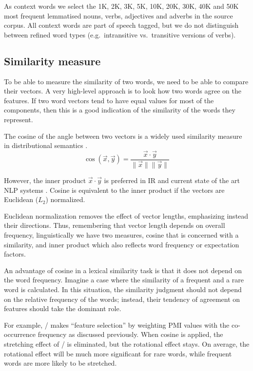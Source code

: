 As context words we select the 1K, 2K, 3K, 5K, 10K, 20K, 30K, 40K and 50K most frequent lemmatised nouns, verbs, adjectives and adverbs in the source corpus. All context words are part of speech tagged, but we do not distinguish between refined word types (e.g.~intransitive vs.~transitive versions of verbs).

\subsection{Similarity measure}
\label{sec:similarity-measure}

To be able to measure the similarity of two words, we need to be able to compare their vectors. A very high-level approach is to look how two words agree on the features. If two word vectors tend to have equal values for most of the components, then this is a good indication of the similarity of the words they represent.

The cosine of the angle between two vectors is a widely used similarity measure in distributional semantics \cite{Turney:2010:FMV:1861751.1861756,lapesa2014large}.
%
\begin{equation*}
  \label{eq:cos}
  \cos(\vec{x}, \vec{y}) = \frac{\vec{x} \cdot \vec{y}}
                                {\|\vec{x}\| \|\vec{y}\|}
\end{equation*}

However, the inner product $\vec{x} \cdot \vec{y}$ is preferred in IR and current state of the art NLP systems \cite{mikolov2013distributed,mikolov2013linguistic,TACL570}. Cosine is equivalent to the inner product if the vectors are Euclidean ($L_2$) normalized.

Euclidean normalization removes the effect of vector lengths, emphasizing instead their directions. Thus, remembering that vector length depends on overall frequency, linguistically we have two measures, cosine that is concerned with a similarity, and inner product which also reflects word frequency or expectation factors.

An advantage of cosine in a lexical similarity task is that it does not depend on the word frequency. Imagine a case where the similarity of a frequent and a rare word is calculated. In this situation, the similarity judgment should not depend on the relative frequency of the words; instead, their tendency of agreement on features should take the dominant role.

For example, \NPMI/ makes ``feature selection'' by weighting PMI values with the co-occurrence frequency as discussed previously. When cosine is applied, the stretching effect of \NPMI/ is eliminated, but the rotational effect stays. On average, the rotational effect will be much more significant for rare words, while frequent words are more likely to be stretched.

